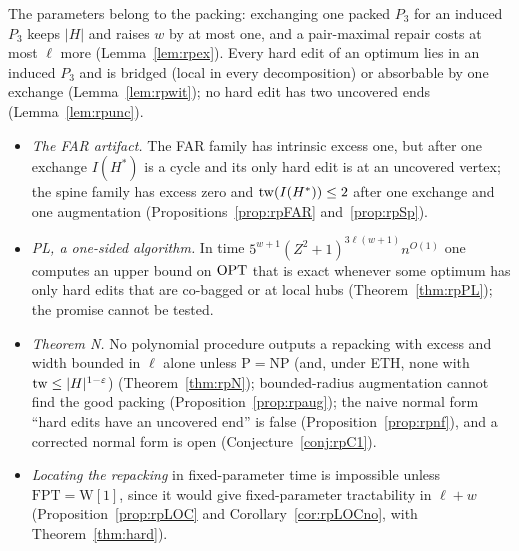  The parameters belong to the packing: exchanging one packed $P_3$ for an induced $P_3$ keeps $|H|$ and raises $w$ by at most one, and a pair-maximal repair costs at most $\ell$ more (Lemma~\ref{lem:rpex}). Every hard edit of an optimum lies in an induced $P_3$ and is bridged (local in every decomposition) or absorbable by one exchange (Lemma~\ref{lem:rpwit}); no hard edit has two uncovered ends (Lemma~\ref{lem:rpunc}).
\begin{itemize}
\item \emph{The FAR artifact.} The FAR family has intrinsic excess one, but after one exchange $I(H^*)$ is a cycle and its only hard edit is at an uncovered vertex; the spine family has excess zero and $\mathrm{tw}(I(H^*))\le2$ after one exchange and one augmentation (Propositions~\ref{prop:rpFAR} and~\ref{prop:rpSp}).
\item \emph{PL, a one-sided algorithm.} In time $5^{w+1}(Z^2+1)^{3\ell(w+1)}n^{O(1)}$ one computes an upper bound on $\mathrm{OPT}$ that is exact whenever some optimum has only hard edits that are co-bagged or at local hubs (Theorem~\ref{thm:rpPL}); the promise cannot be tested.
\item \emph{Theorem N.} No polynomial procedure outputs a repacking with excess and width bounded in $\ell$ alone unless $\mathrm P=\mathrm{NP}$ (and, under ETH, none with $\mathrm{tw}\le|H|^{1-\varepsilon}$) (Theorem~\ref{thm:rpN}); bounded-radius augmentation cannot find the good packing (Proposition~\ref{prop:rpaug}); the naive normal form ``hard edits have an uncovered end'' is false (Proposition~\ref{prop:rpnf}), and a corrected normal form is open (Conjecture~\ref{conj:rpC1}).
\item \emph{Locating the repacking} in fixed-parameter time is impossible unless $\mathrm{FPT}=\mathrm{W[1]}$, since it would give fixed-parameter tractability in $\ell+w$ (Proposition~\ref{prop:rpLOC} and Corollary~\ref{cor:rpLOCno}, with Theorem~\ref{thm:hard}).
\end{itemize}
